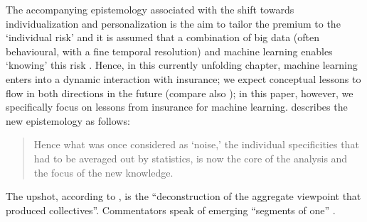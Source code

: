 \documentclass[11pt]{article} %
\begin{document}
The accompanying epistemology associated with the shift towards individualization and personalization is the aim to tailor the premium to the `individual risk' 
and it is assumed that a combination of big data (often behavioural, with a fine temporal resolution) and machine learning enables `knowing' this risk \citep{cevolini2020pool}. Hence, in this currently unfolding chapter, machine learning enters into a dynamic interaction with insurance; we expect conceptual lessons to flow in both directions in the future (compare also \citep{williamson2004dynamic}); in this paper, however, we specifically focus on lessons from insurance for machine learning. \citet{barry2019rationality} describes the new epistemology as follows:
\begin{quote}
    Hence what was once considered as `noise,' the
individual specificities that had to be averaged out by statistics, is now the core of the
analysis and the focus of the new knowledge.
\end{quote}
The upshot, according to \citet{barry2019rationality}, is the ``deconstruction of the aggregate viewpoint that produced collectives''. Commentators speak of emerging ``segments of one'' \citep{prainsack2020shifting}. 
\end{document}
